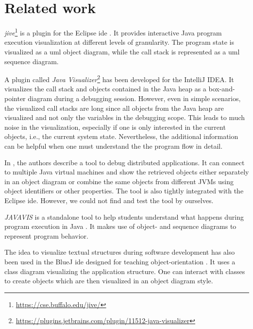 \documentclass[conference]{IEEEtran}
\newcommand{\intellij}{IntelliJ IDEA}
\begin{document}
\section{Related work} \label{sec:relatedWork}
\textit{\gls*{jive}}\footnote{\url{https://cse.buffalo.edu/jive/}} is a plugin for the Eclipse \gls*{ide} \cite{czyzDeclarativeVisualDebugging2007,k.p.FiniteStateModel2021}.
It provides interactive Java program execution visualization at different levels of granularity.
The program state is visualized as a \gls*{uml} object diagram, while the call stack is represented as a \gls*{uml} sequence diagram.

A plugin called \textit{Java Visualizer}\footnote{\url{https://plugins.jetbrains.com/plugin/11512-java-visualizer}} has been developed for the \intellij{}.
It visualizes the call stack and objects contained in the Java heap as a box-and-pointer diagram during a debugging session.
However, even in simple scenarios, the visualized call stacks are long since all objects from the Java heap are visualized and not only the variables in the debugging scope.
This leads to much noise in the visualization, especially if one is only interested in the current objects, i.e., the current system state.
Nevertheless, the additional information can be helpful when one must understand the the program flow in detail. 

In \cite{kochGraphicalDebuggingDistributed2015}, the authors describe a tool to debug distributed applications.
It can connect to multiple Java virtual machines and show the retrieved objects either separately in an object diagram or combine the same objects from different JVMs using object identifiers or other properties.
The tool is also tightly integrated with the Eclipse \gls*{ide}.
However, we could not find and test the tool by ourselves.

\textit{JAVAVIS} is a standalone tool to help students understand what happens during program execution in Java \cite{oechsleJAVAVISAutomaticProgram2002}.
It makes use of object- and sequence diagrams to represent program behavior.

The idea to visualize textual structures during software development has also been used in the BlueJ \gls*{ide} designed for teaching object-orientation \cite{kollingBlueJSystemIts2003,kollingObjectorientedProgramDevelopment1996}.
It uses a class diagram visualizing the application structure.
One can interact with classes to create objects which are then visualized in an object diagram style.
\end{document}
